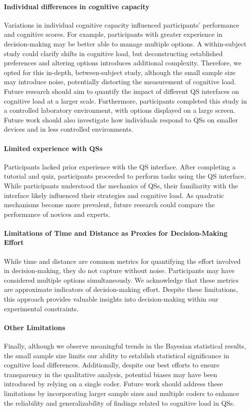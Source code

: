 \paragraph{Individual differences in cognitive capacity}
Variations in individual cognitive capacity influenced participants' performance and cognitive scores. For example, participants with greater experience in decision-making may be better able to manage multiple options.  A within-subject study could clarify shifts in cognitive load, but deconstructing established preferences and altering options introduces additional complexity. Therefore, we opted for this in-depth, between-subject study, although the small sample size may introduce noise, potentially distorting the measurement of cognitive load. Future research should aim to quantify the impact of different QS interfaces on cognitive load at a larger scale. Furthermore, participants completed this study in a controlled laboratory environment, with options displayed on a large screen. Future work should also investigate how individuals respond to QSs on smaller devices and in less controlled environments.

\paragraph{Limited experience with QSs}
Participants lacked prior experience with the QS interface. After completing a tutorial and quiz, participants proceeded to perform tasks using the QS interface. While participants understood the mechanics of QSs, their familiarity with the interface likely influenced their strategies and cognitive load. As quadratic mechanisms become more prevalent, future research could compare the performance of novices and experts.

\paragraph{Limitations of Time and Distance as Proxies for Decision-Making Effort}
While time and distance are common metrics for quantifying the effort involved in decision-making, they do not capture without noise. Participants may have considered multiple options simultaneously. We acknowledge that these metrics are approximate indicators of decision-making effort. Despite these limitations, this approach provides valuable insights into decision-making within our experimental constraints.

\paragraph{Other Limitations}
Finally, although we observe meaningful trends in the Bayesian statistical results, the small sample size limits our ability to establish statistical significance in cognitive load differences. Additionally, despite our best efforts to ensure transparency in the qualitative analysis, potential biases may have been introduced by relying on a single coder. Future work should address these limitations by incorporating larger sample sizes and multiple coders to enhance the reliability and generalizability of findings related to cognitive load in QSs.